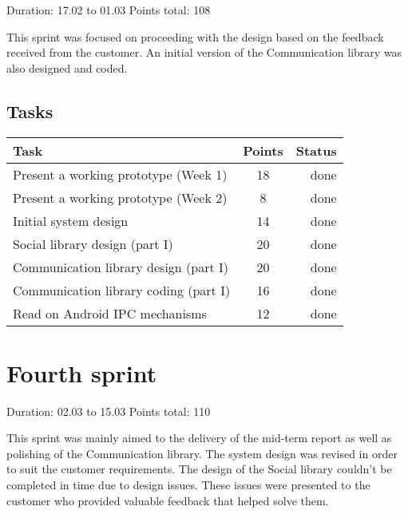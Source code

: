 Duration: 17.02 to 01.03
Points total: 108

This sprint was focused on proceeding with the design based on the
feedback received from the customer. An initial version of the Communication
library was also designed and coded.

\subsection{Tasks}

\begin{table}[ht!]
\begin{tabular}{ | l | c | r | }

\hline
\textbf{Task} & \textbf{Points} & \textbf{Status} \\
\hline

Present a working prototype (Week 1)		& 18 & done \\
\hline
Present a working prototype (Week 2)		& 8  & done \\
\hline
Initial system design						& 14 & done \\
\hline
Social library design (part I)				& 20 & done \\
\hline
Communication library design (part I)		& 20 & done \\
\hline
Communication library coding (part I) 		& 16 & done \\
\hline
Read on Android IPC mechanisms				& 12 & done \\
\hline

\end{tabular}
\end{table}


\newpage


\section{Fourth sprint}

Duration: 02.03 to 15.03
Points total: 110

This sprint was mainly aimed to the delivery of the mid-term report as well
as polishing of the Communication library. The system design was revised in
order to suit the customer requirements. The design of the Social library couldn't
be completed in time due to design issues. These issues were presented to the
customer who provided valuable feedback that helped solve them.

